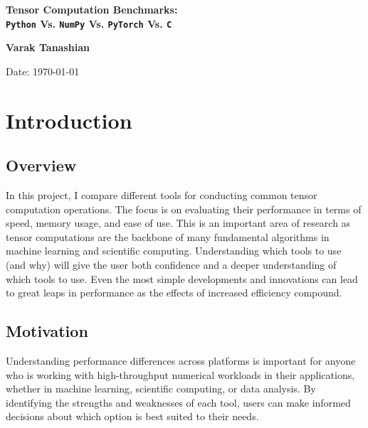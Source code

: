 \documentclass[a4paper,12pt]{article}
\begin{document}

\begin{titlepage}
    \centering
    \vspace*{3cm}
    {\Huge\bfseries Tensor Computation Benchmarks: \\ \texttt{Python} Vs. \texttt{NumPy} Vs. \texttt{PyTorch} Vs. \texttt{C} \par}
    \vspace{2cm}
    {\Large\textbf{Varak Tanashian} \par}
    \vspace{1.5cm}
    {\large Date: \today \par}
    \vfill
\end{titlepage}

\setcounter{page}{1}


\tableofcontents
\newpage

\section{Introduction}
\subsection{Overview}

In this project, I compare different tools for conducting common tensor computation operations. The focus is on evaluating their performance in terms of speed, memory usage, and ease of use. This is an important area of research as tensor computations are the backbone of many fundamental algorithms in machine learning and scientific computing. Understanding which tools to use (and why) will give the user both confidence and a deeper understanding of which tools to use. Even the most simple developments and innovations can lead to great leaps in performance as the effects of increased efficiency compound.

\subsection{Motivation}

Understanding performance differences across platforms is important for anyone who is working with high-throughput numerical workloads in their applications, whether in machine learning, scientific computing, or data analysis. By identifying the strengths and weaknesses of each tool, users can make informed decisions about which option is best suited to their needs. 
\end{document}
